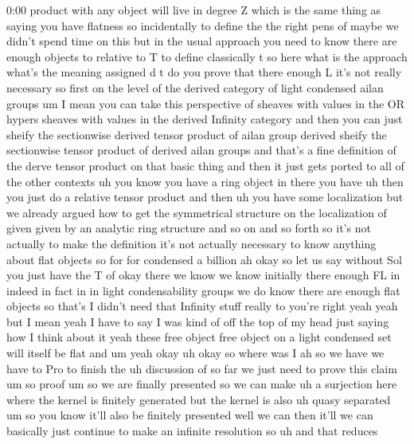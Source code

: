 \begin{unfinished}{0:00}
product  with  any  object  will  live  in
degree  Z  which  is  the  same  thing  as
saying  you  have
flatness  so  incidentally  to  define  the
the  right  pens  of  maybe  we  didn't  spend
time  on  this  but  in  the  usual  approach
you  need  to  know  there  are  enough
objects  to  relative  to  T  to  define
classically
t  so  here  what  is  the  approach  what's
the  meaning
assigned  d  t  do  you  prove  that  there
enough  L  it's  not  really  necessary  so
first  on  the  level  of  the  derived
category  of  light  condensed  ailan
groups  um  I  mean  you  can  take  this
perspective  of  sheaves  with  values  in
the  OR  hypers  sheaves  with  values  in  the
derived  Infinity  category  and  then  you
can  just  sheify  the  sectionwise  derived
tensor  product  of  ailan  group  derived
sheify  the  sectionwise  tensor  product  of
derived  ailan  groups  and  that's  a  fine
definition  of  the  derve  tensor  product
on  that  basic  thing  and  then  it  just
gets  ported  to  all  of  the  other  contexts
uh  you  know  you  have  a  ring  object  in
there  you
have  uh  then  you  just  do  a  relative
tensor  product  and  then  uh  you  have  some
localization  but  we  already  argued  how
to  get  the  symmetrical  structure  on  the
localization  of  given  given  by  an
analytic  ring  structure  and  so  on  and  so
forth  so  it's  not  actually  to  make  the
definition  it's  not  actually  necessary
to  know  anything  about  flat
objects  so  for  for  condensed  a
billion  ah  okay  so  let  us  say  without
Sol  you  just  have  the  T  of  okay  there  we
know  we  know  initially  there  enough  FL
in  indeed  in  fact  in  in  light
condensability  groups  we  do  know  there
are  enough  flat  objects  so  that's  I
didn't  need  that  Infinity  stuff  really
to  you're  right  yeah  yeah  but  I  mean
yeah  I  have  to  say  I  was  kind  of  off  the
top  of  my  head  just  saying  how  I  think
about  it  yeah  these  free  object  free
object  on  a  light  condensed  set  will
itself  be  flat
and  um  yeah  okay
uh  okay  so  where  was  I  ah  so  we  have  we
have  to  Pro  to  finish  the  uh  discussion
of  so  far  we  just  need  to  prove  this
claim
um  so
proof  um  so  we  are  finally  presented  so
we  can
make  uh  a  surjection  here  where  the
kernel  is  finitely
generated  but  the  kernel  is  also  uh
quasy
separated  um  so  you  know  it'll  also  be
finitely  presented  well  we  can  then
it'll  we  can  basically  just  continue  to
make  an  infinite  resolution
so  uh  and  that  reduces

\end{unfinished}
